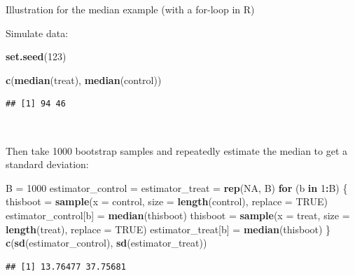 \documentclass[
  10pt,
  ignorenonframetext,
]{beamer}
\newenvironment{Shaded}{\begin{snugshade}}{\end{snugshade}}
\newcommand{\AttributeTok}[1]{\textcolor[rgb]{0.13,0.29,0.53}{#1}}
\newcommand{\ConstantTok}[1]{\textcolor[rgb]{0.56,0.35,0.01}{#1}}
\newcommand{\ControlFlowTok}[1]{\textcolor[rgb]{0.13,0.29,0.53}{\textbf{#1}}}
\newcommand{\DecValTok}[1]{\textcolor[rgb]{0.00,0.00,0.81}{#1}}
\newcommand{\FunctionTok}[1]{\textcolor[rgb]{0.13,0.29,0.53}{\textbf{#1}}}
\newcommand{\NormalTok}[1]{#1}
\newcommand{\OtherTok}[1]{\textcolor[rgb]{0.56,0.35,0.01}{#1}}
\newcommand{\SpecialCharTok}[1]{\textcolor[rgb]{0.81,0.36,0.00}{\textbf{#1}}}
\begin{document}
\begin{frame}[fragile]
\begin{block}{Illustration for the median example (with a for-loop in
R)}
\protect\hypertarget{illustration-for-the-median-example-with-a-for-loop-in-r}{}
\(~\)

Simulate data:

\vspace{2mm}

\scriptsize

\begin{Shaded}
\begin{Highlighting}[]
\FunctionTok{set.seed}\NormalTok{(}\DecValTok{123}\NormalTok{)}

\FunctionTok{c}\NormalTok{(}\FunctionTok{median}\NormalTok{(treat), }\FunctionTok{median}\NormalTok{(control))}
\end{Highlighting}
\end{Shaded}

\begin{verbatim}
## [1] 94 46
\end{verbatim}

\(~\)

\normalsize

Then take 1000 bootstrap samples and repeatedly estimate the median to
get a standard deviation:

\vspace{2mm}

\scriptsize

\begin{Shaded}
\begin{Highlighting}[]
\NormalTok{B }\OtherTok{=} \DecValTok{1000}
\NormalTok{estimator\_control }\OtherTok{=}\NormalTok{ estimator\_treat }\OtherTok{=} \FunctionTok{rep}\NormalTok{(}\ConstantTok{NA}\NormalTok{, B)}
\ControlFlowTok{for}\NormalTok{ (b }\ControlFlowTok{in} \DecValTok{1}\SpecialCharTok{:}\NormalTok{B) \{}
\NormalTok{    thisboot }\OtherTok{=} \FunctionTok{sample}\NormalTok{(}\AttributeTok{x =}\NormalTok{ control, }\AttributeTok{size =} \FunctionTok{length}\NormalTok{(control), }\AttributeTok{replace =} \ConstantTok{TRUE}\NormalTok{)}
\NormalTok{    estimator\_control[b] }\OtherTok{=} \FunctionTok{median}\NormalTok{(thisboot)}
\NormalTok{    thisboot }\OtherTok{=} \FunctionTok{sample}\NormalTok{(}\AttributeTok{x =}\NormalTok{ treat, }\AttributeTok{size =} \FunctionTok{length}\NormalTok{(treat), }\AttributeTok{replace =} \ConstantTok{TRUE}\NormalTok{)}
\NormalTok{    estimator\_treat[b] }\OtherTok{=} \FunctionTok{median}\NormalTok{(thisboot)}
\NormalTok{\}}
\FunctionTok{c}\NormalTok{(}\FunctionTok{sd}\NormalTok{(estimator\_control), }\FunctionTok{sd}\NormalTok{(estimator\_treat))}
\end{Highlighting}
\end{Shaded}

\begin{verbatim}
## [1] 13.76477 37.75681
\end{verbatim}
\end{block}
\end{frame}
\end{document}
